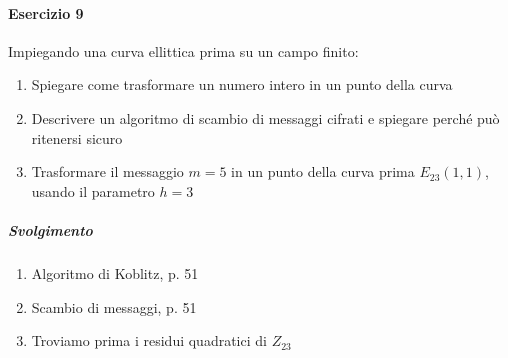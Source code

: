 \documentclass[10pt]{book}
\begin{document}
\paragraph{Esercizio 9} Impiegando una curva ellittica prima su un campo finito:
\begin{enumerate}
	\item Spiegare come trasformare un numero intero in un punto della curva
	\item Descrivere un algoritmo di scambio di messaggi cifrati e spiegare perché può ritenersi sicuro
	\item Trasformare il messaggio $m=5$ in un punto della curva prima $E_{23}(1,1)$, usando il parametro $h=3$
\end{enumerate}
\subparagraph{Svolgimento} \begin{enumerate}
	\item Algoritmo di Koblitz, p. 51
	\item Scambio di messaggi, p. 51
	\item Troviamo prima i residui quadratici di $Z_{23}$
	\begin{multicols}{2}
\end{multicols}
\end{enumerate}
\end{document}
